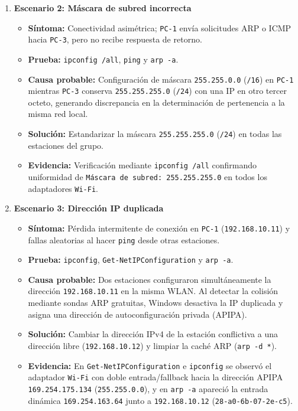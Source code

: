 \documentclass[11pt, a4paper]{article}
\begin{document}
\begin{enumerate}
    \item \textbf{Escenario 2: Máscara de subred incorrecta}
    \begin{itemize}
        \item \textbf{Síntoma:} Conectividad asimétrica; \texttt{PC-1} envía solicitudes ARP o ICMP hacia \texttt{PC-3}, pero no recibe respuesta de retorno.
        \item \textbf{Prueba:} \texttt{ipconfig /all}, \texttt{ping} y \texttt{arp -a}.
        \item \textbf{Causa probable:} Configuración de máscara \texttt{255.255.0.0} (\texttt{/16}) en \texttt{PC-1} mientras \texttt{PC-3} conserva \texttt{255.255.255.0} (\texttt{/24}) con una IP en otro tercer octeto, generando discrepancia en la determinación de pertenencia a la misma red local.
        \item \textbf{Solución:} Estandarizar la máscara \texttt{255.255.255.0} (\texttt{/24}) en todas las estaciones del grupo.
        \item \textbf{Evidencia:} Verificación mediante \texttt{ipconfig /all} confirmando uniformidad de \texttt{Máscara de subred: 255.255.255.0} en todos los adaptadores \texttt{Wi-Fi}.
    \end{itemize}

    \item \textbf{Escenario 3: Dirección IP duplicada}
    \begin{itemize}
        \item \textbf{Síntoma:} Pérdida intermitente de conexión en \texttt{PC-1} (\texttt{192.168.10.11}) y fallas aleatorias al hacer \texttt{ping} desde otras estaciones.
        \item \textbf{Prueba:} \texttt{ipconfig}, \texttt{Get-NetIPConfiguration} y \texttt{arp -a}.
        \item \textbf{Causa probable:} Dos estaciones configuraron simultáneamente la dirección \texttt{192.168.10.11} en la misma WLAN. Al detectar la colisión mediante sondas ARP gratuitas, Windows desactiva la IP duplicada y asigna una dirección de autoconfiguración privada (APIPA).
        \item \textbf{Solución:} Cambiar la dirección IPv4 de la estación conflictiva a una dirección libre (\texttt{192.168.10.12}) y limpiar la caché ARP (\texttt{arp -d *}).
        \item \textbf{Evidencia:} En \texttt{Get-NetIPConfiguration} e \texttt{ipconfig} se observó el adaptador \texttt{Wi-Fi} con doble entrada/fallback hacia la dirección APIPA \texttt{169.254.175.134} (\texttt{255.255.0.0}), y en \texttt{arp -a} apareció la entrada dinámica \texttt{169.254.163.64} junto a \texttt{192.168.10.12} (\texttt{28-a0-6b-07-2e-c5}).
    \end{itemize}
\end{enumerate}
\end{document}
